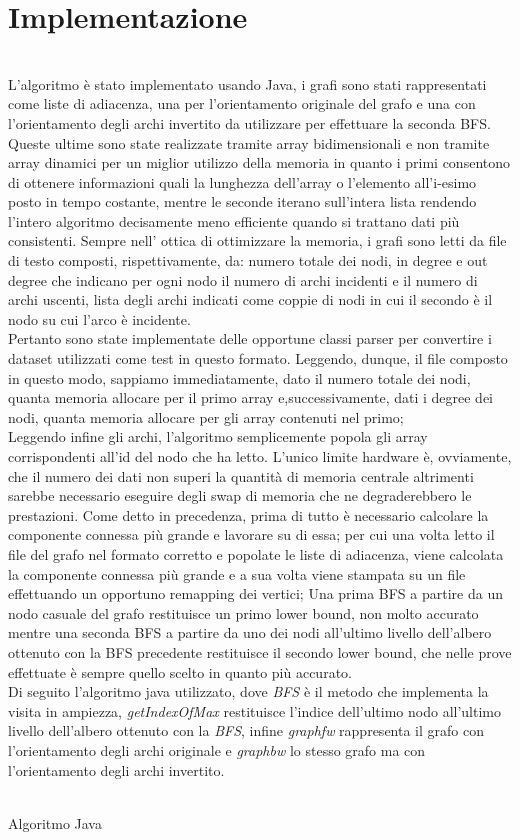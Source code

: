 \documentclass[twoside,openright,titlepage,fleqn,
	headinclude,11pt,a4paper,BCOR5mm,footinclude,pdftex
	]{scrbook}
\begin{document}
\section{Implementazione}\\
L'algoritmo è stato implementato usando Java, i grafi sono stati rappresentati come liste di adiacenza, una per l'orientamento originale del grafo e una con l'orientamento degli archi invertito da utilizzare per effettuare la seconda BFS.\\Queste ultime sono state realizzate tramite array bidimensionali e non tramite array dinamici per un miglior utilizzo della memoria in quanto i primi consentono di ottenere informazioni quali la lunghezza dell'array o l'elemento all'i-esimo posto in tempo costante, mentre le seconde iterano sull'intera lista rendendo l'intero algoritmo decisamente meno efficiente quando si trattano dati più consistenti.
Sempre nell' ottica di ottimizzare la memoria, i grafi sono letti da file di testo composti, rispettivamente, da: numero totale dei nodi, in degree e out degree che indicano per ogni nodo il numero di archi incidenti e il numero di archi uscenti, lista degli archi indicati come coppie di nodi in cui il secondo è il nodo su cui l'arco è incidente.\\Pertanto sono state implementate delle opportune classi parser  per convertire i dataset utilizzati come test in questo formato. Leggendo, dunque, il file composto in questo modo, sappiamo immediatamente, dato il numero totale dei nodi, quanta memoria allocare per il primo array e,successivamente, dati i degree dei nodi, quanta memoria allocare per gli array contenuti nel primo;\\
Leggendo infine gli archi, l'algoritmo semplicemente popola gli array corrispondenti all'id del nodo che ha letto. L'unico limite hardware è, ovviamente, che il numero dei dati non superi la quantità di memoria centrale altrimenti sarebbe necessario eseguire degli swap di memoria che ne degraderebbero le prestazioni.
Come detto in precedenza, prima di tutto è necessario calcolare la componente connessa più grande e lavorare su di essa; per cui una volta letto il file del grafo nel formato corretto e popolate le liste di adiacenza, viene calcolata la componente connessa più grande e a sua volta viene stampata su un file effettuando un opportuno remapping dei vertici; Una prima BFS a partire da un nodo casuale del grafo restituisce un primo lower bound, non molto accurato mentre una seconda BFS a partire da uno dei nodi all'ultimo livello dell'albero ottenuto con la BFS precedente restituisce il secondo lower bound, che nelle prove effettuate è sempre quello scelto in quanto più accurato.\\
Di seguito l'algoritmo java utilizzato, dove \textit{BFS} è il metodo che implementa la visita in ampiezza, \textit{getIndexOfMax} restituisce l'indice dell'ultimo nodo all'ultimo livello dell'albero ottenuto con la \textit{BFS}, infine \textit{graphfw} rappresenta il grafo con l'orientamento degli archi originale e \textit{graphbw} lo stesso grafo ma con l'orientamento degli archi invertito.\\\\ \newpage
\caption{Algoritmo Java}

\end{document}
